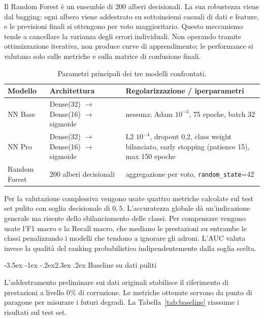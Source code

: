 \documentclass[12pt,a4paper]{article}
\makeatletter
\renewcommand\section{\@startsection{section}{1}{\z@}%
  {-3.5ex \@plus -1ex \@minus -.2ex}{2.3ex \@plus.2ex}%
  {\normalfont\Large\bfseries}}
\makeatother
\begin{document}
Il Random Forest è un ensemble di $200$ alberi decisionali. La sua robustezza
viene dal bagging: ogni albero viene addestrato su sottoinsiemi casuali di dati
e feature, e le previsioni finali si ottengono per voto maggioritario. Questo
meccanismo tende a cancellare la varianza degli errori individuali. Non operando
tramite ottimizzazione iterativa, non produce curve di apprendimento; le
performance si valutano solo sulle metriche e sulla matrice di confusione
finali.

\begin{table}[H]\centering\small
	\caption{Parametri principali dei tre modelli confrontati.}\label{tab:modelli}
	\begin{tabular}{@{}l p{4.6cm} p{6.8cm}@{}}
		\toprule
		\textbf{Modello} & \textbf{Architettura} & \textbf{Regolarizzazione /
		iperparametri} \\
		\midrule
		NN Base & Dense(32) $\to$ Dense(16) $\to$ sigmoide & nessuna; Adam $10^{-3}$,
		75 epoche, batch 32 \\[4pt]
		NN Pro & Dense(32) $\to$ Dense(16) $\to$ sigmoide & L2 $10^{-4}$, dropout 0,2,
		class weight bilanciato, early stopping (patience 15), max 150 epoche \\[4pt]
		Random Forest & 200 alberi decisionali & aggregazione per voto,
		\texttt{random\_state}=42 \\
		\bottomrule
	\end{tabular}
\end{table}

Per la valutazione complessiva vengono usate quattro metriche calcolate sul test
set pulito con soglia decisionale di $0{,}5$. L'accuratezza globale dà
un'indicazione generale ma risente dello sbilanciamento delle classi. Per
compensare vengono usate l'F1 macro e la Recall macro, che mediano le
prestazioni su entrambe le classi penalizzando i modelli che tendono a ignorare
gli adroni. L'AUC valuta invece la qualità del ranking probabilistico
indipendentemente dalla soglia scelta.

\section{Baseline su dati puliti}\label{sec:baseline}

L'addestramento preliminare sui dati originali stabilisce il riferimento di
prestazioni a livello $0\%$ di corruzione. Le metriche ottenute servono da punto
di paragone per misurare i futuri degradi. La Tabella~\ref{tab:baseline}
riassume i risultati sul test set.
\end{document}
